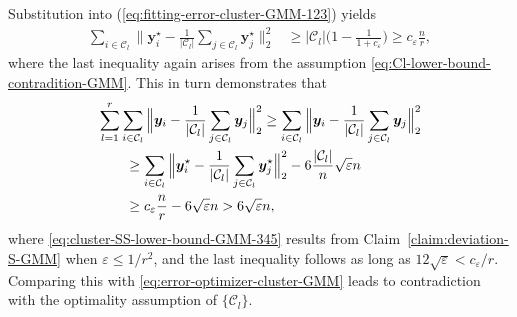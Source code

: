 %
%
Substitution into (\ref{eq:fitting-error-cluster-GMM-123}) yields
%
\begin{align}
\sum_{i\in\mathcal{C}_{l}}\Big\|\bm{y}_{i}^{\star}-\frac{1}{|\mathcal{C}_{l}|}\sum_{j\in\mathcal{C}_{l}}\bm{y}_{j}^{\star}\Big\|_{2}^{2}
& \geq|\mathcal{C}_{l}| \Big(1-\frac{1}{1+c_{\varepsilon}}\Big)
\geq%
c_{\varepsilon}
\frac{n}{r},
\label{eq:fitting-error-cluster-GMM-123-1}
\end{align}
%
where the last inequality again arises from the assumption \eqref{eq:Cl-lower-bound-contradition-GMM}. %
This in turn demonstrates that
%
\begin{align}
 & \sum_{l=1}^{r}\sum_{i\in\mathcal{C}_{l}}\Big\|\bm{y}_{i}-\frac{1}{|\mathcal{C}_{l}|}\sum_{j\in\mathcal{C}_{l}}\bm{y}_{j}\Big\|_{2}^{2}\geq\sum_{i\in\mathcal{C}_{l}}\Big\|\bm{y}_{i}-\frac{1}{|\mathcal{C}_{l}|}\sum_{j\in\mathcal{C}_{l}}\bm{y}_{j}\Big\|_{2}^{2} \notag\\
 & \qquad \geq \sum_{i\in\mathcal{C}_{l}}\Big\|\bm{y}_{i}^{\star}-\frac{1}{|\mathcal{C}_{l}|}\sum_{j\in\mathcal{C}_{l}}\bm{y}_{j}^{\star}\Big\|_{2}^{2}-6\frac{|\mathcal{C}_{l}|}{n}\sqrt{\varepsilon}n
	\label{eq:cluster-SS-lower-bound-GMM-345}\\
 & \qquad \geq %
   c_{\varepsilon}  \frac{n}{r}-6\sqrt{\varepsilon}n
   > 6\sqrt{\varepsilon}n, \notag
\end{align}
%
where \eqref{eq:cluster-SS-lower-bound-GMM-345} results from  Claim~\ref{claim:deviation-S-GMM} when $\varepsilon\leq 1/r^2$, and the last inequality follows as long as $12\sqrt{\varepsilon} < %
c_{\varepsilon} /r$.
%
Comparing this  with \eqref{eq:error-optimizer-cluster-GMM} leads to  contradiction with the optimality assumption of $\{\mathcal{C}_l\}$.




